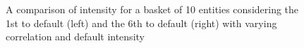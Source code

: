 \begin{figure}
{}
{}
\caption{\label{fig:IntensityBasketSpreads}A comparison of intensity for a basket of 10 entities considering the 1st to default (left) and the 6th to default (right) with varying correlation and default intensity}
\end{figure}


